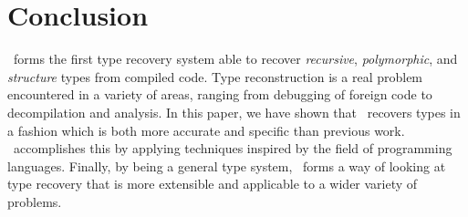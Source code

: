 \section{Conclusion}
\label{sec:conclusion}
\bitr\ forms the first type recovery system able to recover \emph{recursive}, \emph{polymorphic}, and \emph{structure} types from compiled code.
Type reconstruction is a real problem encountered in a variety of areas, ranging from debugging of foreign code to decompilation and analysis.
In this paper, we have shown that \bitr\ recovers types in a fashion which is both more accurate and specific than previous work. \bitr\ accomplishes this by applying techniques inspired by the field of programming languages. Finally, by being a general type system, \bitr\ forms a way of looking at type recovery that is more extensible and applicable to a wider variety of problems.

